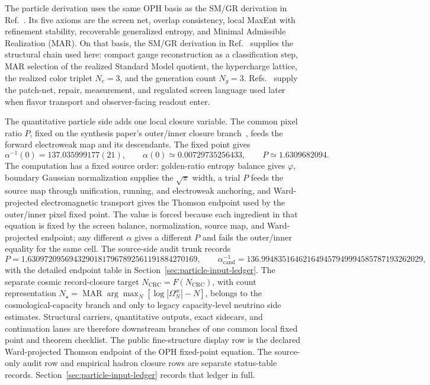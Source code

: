\documentclass[11pt]{article}
\begin{document}
The particle derivation uses the same OPH basis as the SM/GR derivation in Ref.~\cite{ophcompact}. Its five
axioms are the screen net, overlap consistency, local MaxEnt with refinement stability,
recoverable generalized entropy, and Minimal Admissible Realization (MAR). On that basis, the
SM/GR derivation in Ref.~\cite{ophcompact} supplies the structural chain used here: compact gauge reconstruction as a classification step, MAR selection of the realized
Standard Model quotient, the hypercharge lattice, the realized color triplet \(N_c=3\), and the generation count \(N_g=3\).
Refs.~\cite{ophconsensus,ophmicrophysics} supply the patch-net, repair, measurement, and
regulated screen language used later when flavor transport and observer-facing readout enter.

The quantitative particle side adds one local closure variable. The common pixel ratio \(P\),
fixed on the synthesis paper's outer/inner closure branch~\cite{ophsynthesis}, feeds the forward
electroweak map and its descendants. The fixed point gives
\[
\alpha^{-1}(0)=137.035999177(21),
\qquad
\alpha(0)\simeq0.00729735256433,
\qquad
P\simeq1.6309682094.
\]
The computation has a fixed source order: golden-ratio entropy balance gives
\(\varphi\), boundary Gaussian normalization supplies the \(\sqrt{\pi}\) width,
a trial \(P\) feeds the source map through unification, running, and electroweak
anchoring, and Ward-projected electromagnetic transport gives the Thomson
endpoint used by the outer/inner pixel fixed point.
The value is forced because each ingredient in that equation is fixed by the
screen balance, normalization, source map, and Ward-projected endpoint; any
different \(\alpha\) gives a different \(P\) and fails the outer/inner equality
for the same cell.
The source-side audit trunk records
\[
P=1.63097209569432901817967892561191884270169,
\qquad
\alpha_{\mathrm{cand}}^{-1}=136.994835164621649457949994585787193262029,
\]
with the detailed endpoint table in Section~\ref{sec:particle-input-ledger}. The separate
cosmic record-closure target \(N_{\mathrm{CRC}}=F(N_{\mathrm{CRC}})\), with count representation
\(N_\star=\operatorname{MAR}\arg\max_N[\log|\Omega^{\mathrm{sc}}_N|-N]\), belongs to the cosmological-capacity branch and
only to legacy capacity-level neutrino side estimates. Structural carriers, quantitative outputs,
exact sidecars, and continuation lanes are therefore downstream branches of one common local fixed point and theorem
checklist. The public fine-structure display row is the declared Ward-projected Thomson endpoint
of the OPH fixed-point equation. The source-only audit row and empirical hadron closure rows are
separate status-table records.
Section~\ref{sec:particle-input-ledger}
records that ledger in full.
\end{document}
